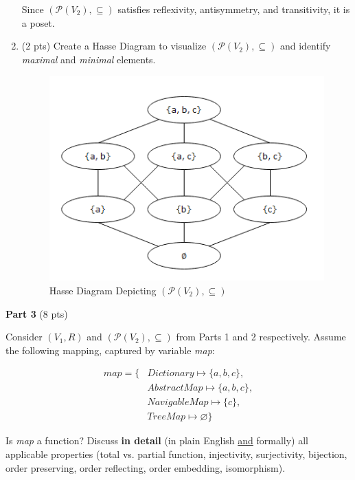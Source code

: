 \documentclass[12pt]{article}
\begin{document}
\begin{spacing}{1.5}
\begin{enumerate}
        Since \( (\mathcal{P}(V_2),\subseteq) \) satisfies reflexivity, antisymmetry, and transitivity, it is a poset.
        
		\item (2 pts) Create a Hasse Diagram to visualize $(\mathcal{P}(V_2),\subseteq)$ and identify \textit{maximal} and \textit{minimal} elements.

        \begin{figure}[htp]
    		\centering
    		\includegraphics{HasseDiagram_6_2_3.png}
    		\caption{Hasse Diagram Depicting $(\mathcal{P}(V_2),\subseteq)$}
    		\label{fig:figure}
    	\end{figure}
  
	\end{enumerate}
	    
	\noindent \textbf{Part 3} (8 pts)
	
	\noindent Consider $(V_1, R)$ and $(\mathcal{P}(V_2), \subseteq)$ from Parts 1 and 2 respectively. Assume the following mapping, captured by variable \textit{map}:
	
	\begin{align*}
		map = \{ & Dictionary \mapsto \{a,b,c\},  \\
		         & AbstractMap \mapsto \{a,b,c\}, \\
		         & NavigableMap \mapsto \{c\},    \\
		         & TreeMap \mapsto \varnothing\}  
	\end{align*}
	
	\noindent Is \textit{map} a function? Discuss \textbf{in detail} (in plain English \uline{and} formally) all applicable properties (total vs. partial function, injectivity, surjectivity, bijection, order preserving, order reflecting, order embedding, isomorphism).\\


\end{spacing}
\end{document}
